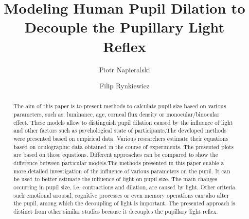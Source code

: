 \documentclass[USenglish,twocolumn]{article}
\begin{document}
 

  \author[1]{Piotr Napieralski}

  \author[2]{Filip Rynkiewicz}



  \title{\huge Modeling Human Pupil Dilation to Decouple the Pupillary Light Reflex}



\begin{abstract}
\indent The aim of this paper is to present methods to calculate pupil size based on various parameters, such as: luminance, age, corneal flux density or monocular/binocular effect. These models allow to distinguish pupil dilation caused by the influence of light and other factors such as psychological state of participants.The developed methods were presented based on empirical data. Various researchers estimate their equations based on oculographic data obtained in the course of experiments. The presented plots are based on those equations. Different approaches can be compared to show the difference between particular models.The methods presented in this paper enable a more detailed investigation of the influence of various parameters on the pupil. It can be used to better estimate the influence of light on pupil size. The main changes occurring in pupil size, i.e. contractions and dilation, are caused by light. Other criteria such emotional arousal, cognitive processes or even memory operations can also alter the pupil, among which the decoupling of light is important. The presented approach is distinct from other similar studies because it decouples the pupillary light reflex.
\end{abstract}
  


\end{document}
